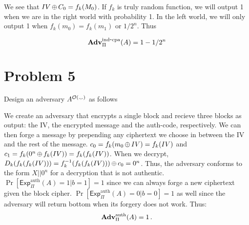 \documentclass[11pt]{article}
\newcommand{\ExpAuth}[2]{\mathsf{Exp}^{\mathrm{auth}}_{#1}{(#2)}}
\newcommand{\AdvIND}[2]{\Adv^{\mathrm{ind}\mbox{-}\mathrm{cpa}}_{#1}(#2)}
\newcommand{\AdvAuth}[2]{\Adv^{\mathrm{auth}}_{#1}(#2)}
\begin{document}
We see that $IV {\,\oplus\,} C_0 = f_k(M_0)$. If $f_k$ is truly random function, we will output 1 when we are in the right world with probability 1. In the left world, we will only output 1 when $f_k(m_0) = f_k(m_1)$ or $1/2^n$.  Thus 

\[
\AdvIND{\Pi}{A} = 1-1/2^n
\]

\section*{Problem 5}
Design an adversary $A^{{\cal O}(.,.)}$ as follows


\begin{figure*}[h]
\center
{}
\end{figure*}



We create an adversary that encrypts a single block and recieve three blocks as output: the IV, the encrypted message and the auth-code, respectively. We can then forge a message by prepending any ciphertext we choose in between the IV and the rest of the message.  $c_0 = f_k(m_0 {\,\oplus\,} IV) = f_k(IV)$ and $c_1 = f_k(0^n {\,\oplus\,} f_k(IV)) = f_k(f_k(IV))$.  When we decrypt, $D_k(f_k(f_k(IV))) =  f_k^{-1}(f_k(f_k(IV))) {\,\oplus\,} c_0 = 0^n$.  Thus, the adversary conforms to the form $X||0^n$ for a decryption that is not authentic.
\\


$\Pr\left[\ExpAuth{\Pi}{A}=1 | b = 1 \right] = 1$ since we can always forge a new ciphertext given the block cipher.  $\Pr\left[\ExpAuth{\Pi}{A}=0 | b = 0 \right] = 1$ as well since the adversary will return bottom when its forgery does not work. Thus:
\[
\AdvAuth{\Pi}{A} = 1 \,.
\]
\end{document}
